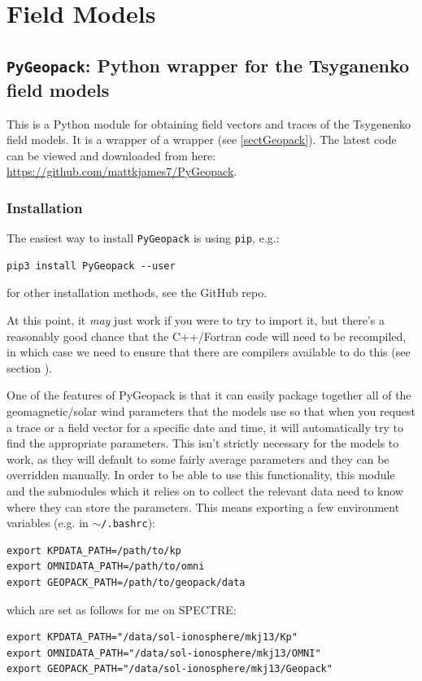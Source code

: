 \chapter{Field Models}

	\section{\texttt{PyGeopack}: Python wrapper for the Tsyganenko field models}

		This is a Python module for obtaining field vectors and traces of the Tsygenenko field models. It is a wrapper of a wrapper (see \ref{sectGeopack}). The latest code can be viewed and downloaded from here: \href{https://github.com/mattkjames7/PyGeopack}{https://github.com/mattkjames7/PyGeopack}.

		\subsection{Installation}

			The easiest way to install \texttt{PyGeopack} is using \texttt{pip}, e.g.:
			\begin{verbatim}
pip3 install PyGeopack --user
			\end{verbatim}
			for other installation methods, see the GitHub repo.

			At this point, it \textit{may} just work if you were to try to import it, but there's a reasonably good chance that the C++/Fortran code will need to be recompiled, in which case we need to ensure that there are compilers available to do this (see section ). 

			One of the features of PyGeopack is that it can easily package together all of the geomagnetic/solar wind parameters that the models use so that when you request a trace or a field vector for a specific date and time, it will automatically try to find the appropriate parameters. This isn't strictly necessary for the models to work, as they will default to some fairly average parameters and they can be overridden manually. In order to be able to use this functionality, this module and the submodules which it relies on to collect the relevant data need to know where they can store the parameters. This means exporting a few environment variables (e.g. in \texttt{$\sim$/.bashrc}):
			\begin{verbatim}
export KPDATA_PATH=/path/to/kp
export OMNIDATA_PATH=/path/to/omni
export GEOPACK_PATH=/path/to/geopack/data				
			\end{verbatim}
			which are set as follows for me on SPECTRE:
			\begin{verbatim}
export KPDATA_PATH="/data/sol-ionosphere/mkj13/Kp"
export OMNIDATA_PATH="/data/sol-ionosphere/mkj13/OMNI"
export GEOPACK_PATH="/data/sol-ionosphere/mkj13/Geopack"			
			\end{verbatim}	
			
